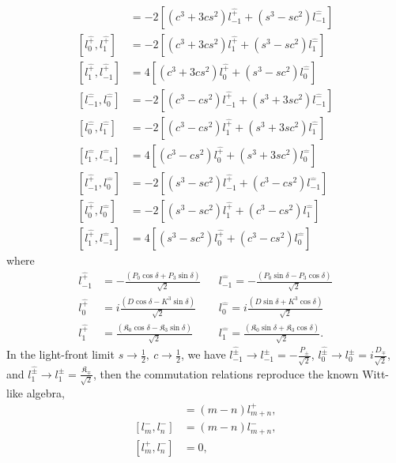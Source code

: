 \documentclass[%
 reprint,
superscriptaddress,
 amsmath,amssymb,
 aps,
]{revtex4-2}
\begin{document}
\begin{align}
    [l^{\hat{+}}_{-1},l^{\hat{+}}_{0}]&=-2[(c^{3}+3cs^{2})l^{\hat{+}}_{-1}+(s^{3}-sc^{2})l^{\hat{-}}_{-1}]\\
    [l^{\hat{+}}_{0},l^{\hat{+}}_{1}]&=-2[(c^{3}+3cs^{2})l^{\hat{+}}_{1}+(s^{3}-sc^{2})l^{\hat{-}}_{1}]\\
    [l^{\hat{+}}_{1},l^{\hat{+}}_{-1}]&=4[(c^{3}+3cs^{2})l^{\hat{+}}_{0}+(s^{3}-sc^{2})l^{\hat{-}}_{0}]\\
    [l^{\hat{-}}_{-1},l^{\hat{-}}_{0}]&=-2[(c^{3}-cs^{2})l^{\hat{+}}_{-1}+(s^{3}+3sc^{2})l^{\hat{-}}_{-1}]\\
    [l^{\hat{-}}_{0},l^{\hat{-}}_{1}]&=-2[(c^{3}-cs^{2})l^{\hat{+}}_{1}+(s^{3}+3sc^{2})l^{\hat{-}}_{1}]\\
    [l^{\hat{-}}_{1},l^{\hat{-}}_{-1}]&=4[(c^{3}-cs^{2})l^{\hat{+}}_{0}+(s^{3}+3sc^{2})l^{\hat{-}}_{0}]\\
    [l^{\hat{+}}_{-1},l^{\hat{-}}_{0}]&=-2[(s^{3}-sc^{2})l^{\hat{+}}_{-1}+(c^{3}-cs^{2})l^{\hat{-}}_{-1}]\\
    [l^{\hat{+}}_{0},l^{\hat{-}}_{0}]&=-2[(s^{3}-sc^{2})l^{\hat{+}}_{1}+(c^{3}-cs^{2})l^{\hat{-}}_{1}]\\
    [l^{\hat{+}}_{1},l^{\hat{-}}_{-1}]&=4[(s^{3}-sc^{2})l^{\hat{+}}_{0}+(c^{3}-cs^{2})l^{\hat{-}}_{0}]
\end{align}
where
\begin{align}
    l^{\hat{+}}_{-1}&=-\frac{(P_{0}\cos{\delta}+P_{3}\sin{\delta})}{\sqrt{2}} &&l^{\hat{-}}_{-1}=-\frac{(P_{0}\sin{\delta}-P_{3}\cos{\delta})}{\sqrt{2}}\\
    l^{\hat{+}}_{0}&=i\frac{(D\cos{\delta}-K^{3}\sin{\delta})}{\sqrt{2}} &&l^{\hat{-}}_{0}=i\frac{(D\sin{\delta}+K^{3}\cos{\delta})}{\sqrt{2}}\\
    l^{\hat{+}}_{1}&=\frac{(\mathfrak{K}_{0}\cos{\delta}-\mathfrak{K}_{3}\sin{\delta})}{\sqrt{2}} &&l^{\hat{-}}_{1}=\frac{(\mathfrak{K}_{0}\sin{\delta}+\mathfrak{K}_{3}\cos{\delta})}{\sqrt{2}}.
\end{align}
In the light-front limit $s\rightarrow\frac{1}{2},~c\rightarrow\frac{1}{2}$, we have $ l^{\hat{\pm}}_{-1}\rightarrow l^{\pm}_{-1}=-\frac{P_{\pm}}{\sqrt{2}}$, $l^{\hat{\pm}}_{0}\rightarrow l^{\pm}_{0}=i\frac{D_{\mp}}{\sqrt{2}}$, and $l^{\hat{\pm}}_{1}\rightarrow l^{\pm}_{1}= \frac{\mathfrak{K}_{\mp}}{\sqrt{2}}$, then the commutation relations reproduce the known Witt-like algebra,
\begin{align}
    [l^{+}_m,l^{+}_n]&=(m-n)l^{+}_{m+n},\\
    [l^{-}_m,l^{-}_n]&=(m-n)l^{-}_{m+n},\\
    [l^{+}_m,l^{-}_n]&=0,
\end{align}
\end{document}
